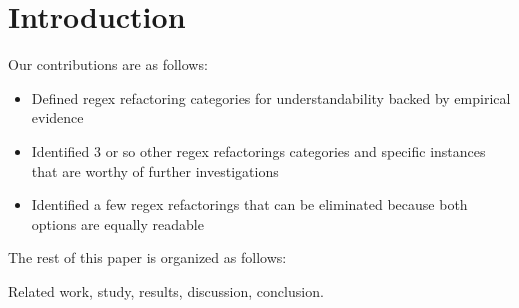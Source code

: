 \section{Introduction }

Our contributions are as follows:
\begin{itemize}
\item {Defined regex refactoring categories for understandability backed by empirical evidence}
\item {Identified 3 or so other regex refactorings categories and specific instances that are worthy of further investigations}
\item {Identified a few regex refactorings that can be eliminated because both options are equally readable}
\end{itemize}

The rest of this paper is organized as follows:

Related work, study, results, discussion, conclusion.
